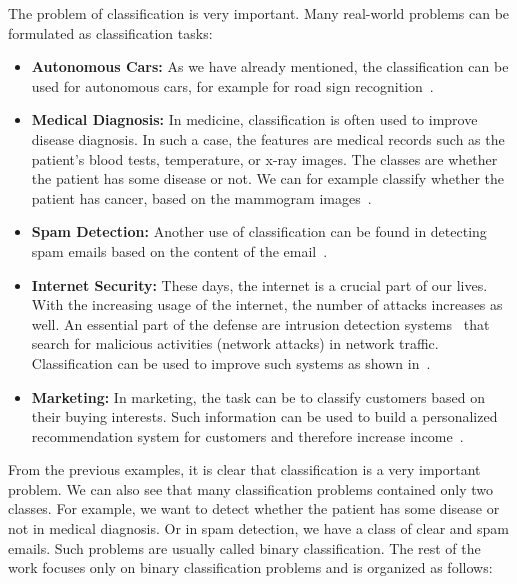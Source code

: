 The problem of classification is very important. Many real-world problems can be formulated as classification tasks: 
\begin{itemize}
  \item \textbf{Autonomous Cars:} As we have already mentioned, the classification can be used for autonomous cars, for example for road sign recognition~\cite{swaminathan2019autonomous}.
  \item \textbf{Medical Diagnosis:} In medicine, classification is often used to improve disease diagnosis. In such a case, the features are medical records such as the patient's blood tests, temperature, or x-ray images. The classes are whether the patient has some disease or not. We can for example classify whether the patient has cancer, based on the mammogram images~\cite{viale2012current, levy2016breast}.
  \item \textbf{Spam Detection:} Another use of classification can be found in detecting spam emails based on the content of the email~\cite{pantel1998spamcop}.
  \item \textbf{Internet Security:} These days, the internet is a crucial part of our lives. With the increasing usage of the internet, the number of attacks increases as well. An essential part of the defense are intrusion detection systems~\cite{grill2016learning, scarfone2007guide} that search for malicious activities (network attacks) in network traffic. Classification can be used to improve such systems as shown in~\cite{giacinto2002intrusion, shanbhag2009accurate}.
  \item \textbf{Marketing:} In marketing, the task can be to classify customers based on their buying interests. Such information can be used to build a personalized recommendation system for customers and therefore increase income~\cite{kaefer2005neural, zhang2007building}.
\end{itemize}
From the previous examples, it is clear that classification is a very important problem. We can also see that many classification problems contained only two classes. For example, we want to detect whether the patient has some disease or not in medical diagnosis. Or in spam detection, we have a class of clear and spam emails. Such problems are usually called binary classification. The rest of the work focuses only on binary classification problems and is organized as follows:
